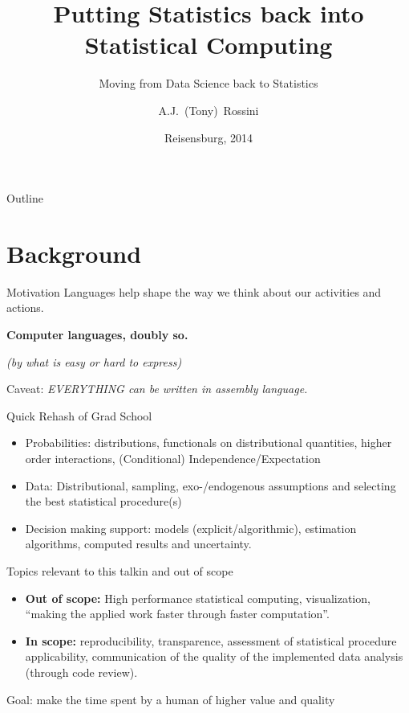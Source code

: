 \documentclass{beamer}
\title[``Statistical'' Computing]
{Putting Statistics back into Statistical Computing}
\subtitle{Moving from Data Science back to Statistics}
\author[] 
{A.J.~(Tony)~Rossini}
\institute[Novartis Pharma AG and University of Washington]
{
  Quantitative Safety and Epidemiology\\
  Novartis Pharma AG \\
  Basel
  \and
  Department of Biomedical and Health Informatics\\
  University of Washington}
\date[StatComp 2014] %
{Reisensburg, 2014}
\begin{document}
\begin{frame}
  \titlepage
\end{frame}

\begin{frame}{Outline}
  \tableofcontents
\end{frame}


\section{Background}

\begin{frame}{Motivation}
  Languages help shape the way we think about our activities and
  actions.

  \vspace*{1cm}

  \textbf{Computer languages, doubly so.}  
  
  \vspace*{1cm}

  \textit{(by what is easy or hard to express)}

  \vspace*{1cm}

  Caveat: \textit{EVERYTHING can be written in assembly language.}
\end{frame}

\begin{frame}{Quick Rehash of Grad School}
  \begin{itemize}
  \item Probabilities: distributions, functionals on distributional
    quantities, higher order interactions, (Conditional)
    Independence/Expectation
  \item Data: Distributional, sampling, exo-/endogenous assumptions and
    selecting the best statistical procedure(s)
  \item Decision making support: models (explicit/algorithmic),
    estimation algorithms, computed results and uncertainty.
  \end{itemize}
\end{frame}

\begin{frame}{Topics relevant to this talk}{in and out of scope}


  \begin{itemize}
  \item \textbf{Out of scope:} High performance statistical computing,
    visualization, ``making the applied work faster through faster
    computation''.
  \item \textbf{In scope:} reproducibility, transparence, assessment
    of statistical procedure applicability, communication of the
    quality of the implemented data analysis (through code review).
  \end{itemize}

  Goal: make the time spent by a human of higher value and quality
\end{frame}
\end{document}
